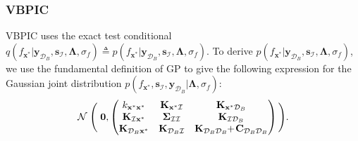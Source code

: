 \documentclass[conference]{IEEEtran}
\begin{document}
	\subsubsection{VBPIC}
	VBPIC uses the exact test conditional $q(f_{\mathbf{x}^*}|\mathbf{y}_{\mathcal{D}_B}, \mathbf{s}_\mathcal{I},\mathbf{\Lambda},\sigma_f)\triangleq p(f_{\mathbf{x}^*}|\mathbf{y}_{\mathcal{D}_B}, \mathbf{s}_\mathcal{I},\mathbf{\Lambda},\sigma_f)$.
	To derive $p(f_{\mathbf{x}^*}|\mathbf{y}_{\mathcal{D}_B}, \mathbf{s}_\mathcal{I},\mathbf{\Lambda}, \sigma_f)$, we use the fundamental definition of GP to give the following expression for the Gaussian joint distribution $p(f_{\mathbf{x}^*},\mathbf{s}_\mathcal{I},\mathbf{y}_{\mathcal{D}_B}|\mathbf{\Lambda},\sigma_f)$:
	\begin{equation*}
		\mathcal{N}\Biggm(\mathbf{0},
		\begin{pmatrix}
			k_{\mathbf{x}^*\mathbf{x}^*} & \mathbf{K}_{\mathbf{x}^*\mathcal{I}} & \mathbf{K}_{\mathbf{x}^*\mathcal{D}_B}\\
			\mathbf{K}_{\mathcal{I}\mathbf{x}^*} & \mathbf{\Sigma}_{\mathcal{I}\mathcal{I}} & \mathbf{K}_{\mathcal{I}\mathcal{D}_B} \\
			\mathbf{K}_{\mathcal{D}_B\mathbf{x}^*} & \mathbf{K}_{\mathcal{D}_B\mathcal{I}} & \mathbf{K}_{\mathcal{D}_B\mathcal{D}_B}\hspace{-1mm} + \hspace{-0.5mm} \mathbf{C}_{\mathcal{D}_B\mathcal{D}_B}
		\end{pmatrix}\Bigg).
	\end{equation*} 
\end{document}
